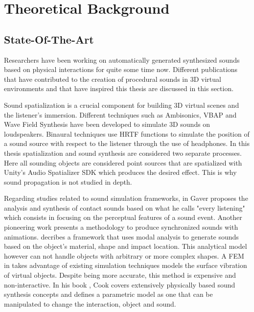 \chapter{Theoretical Background}\label{ch:theory}

\section{State-Of-The-Art}\label{sec:state_art}





Researchers have been working on automatically generated synthesized sounds based on physical interactions for quite some time now. Different publications that have contributed to the creation of procedural sounds in 3D virtual environments and that have inspired this thesis are discussed in this section.

Sound spatialization is a crucial component for building 3D virtual scenes and the listener's immersion. Different techniques such as Ambisonics, VBAP and Wave Field Synthesis have been developed to simulate 3D sounds on loudspeakers. Binaural techniques use HRTF functions to simulate the position of a sound source with respect to the listener through the use of headphones. In this thesis spatialization and sound synthesis are considered two separate processes. Here all sounding objects are considered point sources that are spatialized with Unity's Audio Spatializer SDK \cite{bib:unity_doc} which produces the desired effect. This is why sound propagation is not studied in depth. 

Regarding studies related to sound simulation frameworks, in \cite{gaver1993we, gaver1993world} Gaver proposes the analysis and synthesis of contact sounds based on what he calls "every listening" which consists in focusing on the perceptual features of a sound event. Another pioneering work \cite{takala1992sound} presents a methodology to produce synchronized sounds with animations. \cite{van1998sounds} decribes a framework that uses modal analysis to generate sounds based on the object's material, shape and impact location. This analytical model however can not handle objects with arbitrary or more complex shapes. A \gls{FEM} in \cite{director2001synthesizing} takes advantage of existing simulation techniques models the surface vibration of virtual objects. Despite being more accurate, this method is expensive and non-interactive. In his book \cite{Cook:2002:RSS:515316}, Cook covers extensively physically based sound synthesis concepts and defines a parametric model as one that can be manipulated to change the interaction, object and sound.  

